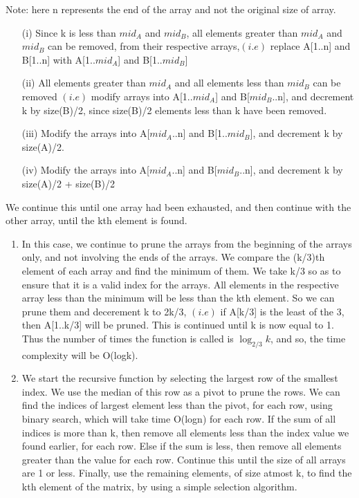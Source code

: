 \documentclass[12pt]{article}
\begin{document}
\begin{enumerate}
    Note: here n represents the end of the array and not the original size of array.
    \begin{enumerate}
        \item[(i)] Since k is less than $mid_A$ and $mid_B$, all elements greater than $mid_A$ and $mid_B$ can be removed, from their respective arrays,$(i.e)$ replace A[1..n] and B[1..n] with A[1..$mid_A$] and B[1..$mid_B$]
        \item[(ii)] All elements greater than $mid_A$ and all elements less than $mid_B$ can be removed $(i.e)$ modify arrays into A[1..$mid_A$] and B[$mid_B$..n], and decrement k by size(B)/2, since size(B)/2 elements less than k have been removed. 
        \item[(iii)] Modify the arrays into A[$mid_A$..n] and B[1..$mid_B$], and decrement k by size(A)/2.
        \item[(iv)] Modify the arrays into A[$mid_A$..n] and B[$mid_B$..n], and decrement k by size(A)/2 + size(B)/2
    \end{enumerate}
    We continue this until one array had been exhausted, and then continue with the other array, until the kth element is found.
    \begin{enumerate}
        \item In this case, we continue to prune the arrays from the beginning of the arrays only, and not involving the ends of the arrays. We compare the (k/3)th element of each array and find the minimum of them. We take k/3 so as to ensure that it is a valid index for the arrays. All elements in the respective array less than the minimum will be less than the kth element. So we can prune them and decerement k to 2k/3, $(i.e)$ if A[k/3] is the least of the 3, then A[1..k/3] will be pruned. This is continued until k is now equal to 1. Thus the number of times the function is called is $\log_{2/3} k$, and so, the time complexity will be O(logk).
        \item We start the recursive function by selecting the largest row of the smallest index. We use the median of this row as a pivot to prune the rows. We can find the indices of largest element less than the pivot, for each row, using binary search, which will take time O(logn) for each row. If the sum of all indices is more than k, then remove all elements less than the index value we found earlier, for each row. Else if the sum is less, then remove all elements greater than the value for each row. Continue this until the size of all arrays are 1 or less. Finally, use the remaining elements, of size atmost k, to find the kth element of the matrix, by using a simple selection algorithm. 
        

\end{enumerate}
\end{enumerate}
\end{document}
